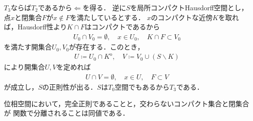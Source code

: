 	\begin{prf}
		$T_3$ならば$T_2$であるから$\Longleftarrow$を得る．
		逆に$S$を局所コンパクトHausdorff空間とし，点$x$と閉集合$F$が$x \notin F$を満たしているとする．
		$x$のコンパクトな近傍$K$を取れば，Hausdorff性より$K \cap F$はコンパクトであるから
		\begin{align}
			U_0 \cap V_0 = \emptyset, \quad x \in U_0,  \quad K \cap F \subset V_0
		\end{align}
		を満たす開集合$U_0,V_0$が存在する．このとき，
		\begin{align}
			U \coloneqq U_0 \cap K^{\mathrm{o}},
			\quad V \coloneqq V_0 \cup (S \backslash K)
		\end{align}
		により開集合$U,V$を定めれば
		\begin{align}
			U \cap V = \emptyset,
			\quad x \in U,
			\quad F \subset V
		\end{align}
		が成立し，$S$の正則性が出る．$S$は$T_0$空間でもあるから$T_3$である．
		\QED
	\end{prf}
	
	\begin{screen}
		\begin{thm}[完全正則なら正則]
		\end{thm}
	\end{screen}
	
	\begin{screen}
		\begin{thm}[完全正則空間とは交わらないコンパクト集合と閉集合が関数で分離される空間]
			位相空間において，完全正則であることと，交わらないコンパクト集合と閉集合が
			関数で分離されることは同値である．
		\end{thm}
	\end{screen}
	
